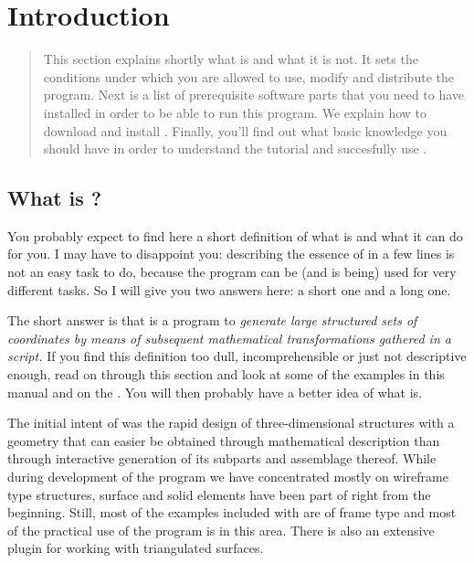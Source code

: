 
\chapter{Introduction}
\label{cha:introduction}

\ifhtml\begin{abstract}\fi
\noindent
This section explains shortly what \pyformex is and what it is not. It sets the conditions under which you are allowed to use, modify and distribute the program. Next is a list of prerequisite software parts that you need to have installed in order to be able to run this program. We explain how to download and install \pyformex. Finally, you'll find out what basic knowledge you should have in order to understand the tutorial and succesfully use \pyformex. 
\ifhtml\end{abstract}\fi


\section{What is \pyformex?}
\label{sec:what-pyformex}

You probably expect to find here a short definition of what \pyformex is and what it can do for you. I may have to disappoint you: describing the essence of \pyformex in a few lines is not an easy task to do, because the program can be (and is being) used for very different tasks. So I will give you two answers here: a short one and a long one.

The short answer is that \pyformex is a program to \emph{generate large structured sets of coordinates by means of subsequent mathematical transformations gathered in a script.}
If you find this definition too dull, incomprehensible or just not descriptive enough, read on through this section and look at some of the examples in this manual and on the . You will then probably have a better idea of what \pyformex{} is. 

The initial intent of \pyformex was the rapid design of three-dimensional structures with a geometry that can easier be obtained through mathematical description than through interactive generation of its subparts and assemblage thereof. While during development of the program we have concentrated mostly on wireframe type structures, surface and solid elements have been part of \pyformex right from the beginning. Still, most of the examples included with \pyformex are of frame type and most of the practical use of the program is in this area. There is also an extensive plugin for working with triangulated surfaces.

